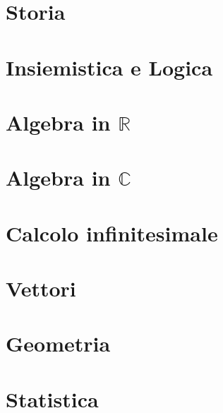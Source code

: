 
\part{Storia}


\part{Insiemistica e Logica}

\part{Algebra in $\mathbb{R}$}


\part{Algebra in $\mathbb{C}$}\label{book:complex_algebra}


\part{Calcolo infinitesimale}


\part{Vettori}


\part{Geometria}


\part{Statistica}
